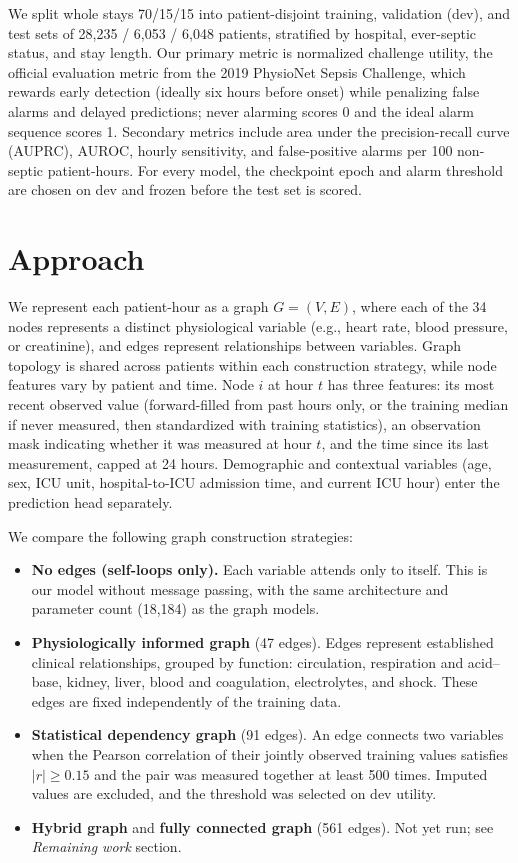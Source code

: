 \documentclass{article}
\begin{document}
We split whole stays 70/15/15 into patient-disjoint training, validation (dev), and test sets of 28,235 / 6,053 / 6,048 patients, stratified by hospital, ever-septic status, and stay length. Our primary metric is normalized challenge utility, the official evaluation metric from the 2019 PhysioNet Sepsis Challenge, which rewards early detection (ideally six hours before onset) while penalizing false alarms and delayed predictions; never alarming scores 0 and the ideal alarm sequence scores 1. Secondary metrics include area under the precision-recall curve (AUPRC), AUROC, hourly sensitivity, and false-positive alarms per 100 non-septic patient-hours. For every model, the checkpoint epoch and alarm threshold are chosen on dev and frozen before the test set is scored.


\section{Approach}

We represent each patient-hour as a graph \(G=(V,E)\), where each of the 34 nodes represents a distinct physiological variable (e.g., heart rate, blood pressure, or creatinine), and edges represent relationships between variables. Graph topology is shared across patients within each construction strategy, while node features vary by patient and time. Node $i$ at hour $t$ has three features: its most recent observed value (forward-filled from past hours only, or the training median if never measured, then standardized with training statistics), an observation mask indicating whether it was measured at hour $t$, and the time since its last measurement, capped at 24 hours. Demographic and contextual variables (age, sex, ICU unit, hospital-to-ICU admission time, and current ICU hour) enter the prediction head separately.
 
We compare the following graph construction strategies:
\begin{itemize}
    \item \textbf{No edges (self-loops only).} Each variable attends only to itself. This is our model without message passing, with the same architecture and parameter count (18,184) as the graph models.
    \item \textbf{Physiologically informed graph} (47 edges). Edges represent established clinical relationships, grouped by function: circulation, respiration and acid--base, kidney, liver, blood and coagulation, electrolytes, and shock. These edges are fixed independently of the training data.
    \item \textbf{Statistical dependency graph} (91 edges). An edge connects two variables when the Pearson correlation of their jointly observed training values satisfies $|r| \ge 0.15$ and the pair was measured together at least 500 times. Imputed values are excluded, and the threshold was selected on dev utility.
    \item \textbf{Hybrid graph} and \textbf{fully connected graph} (561 edges). Not yet run; see \textit{Remaining work} section.
\end{itemize}
 
\end{document}
